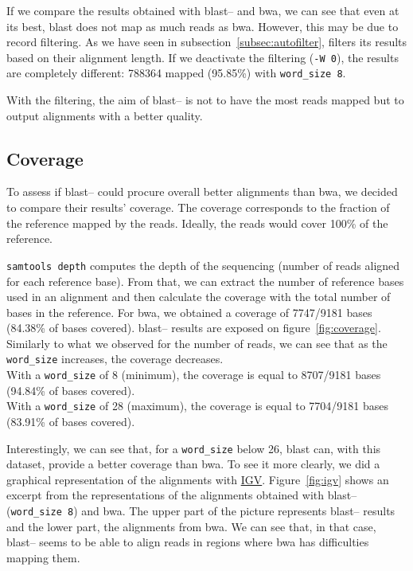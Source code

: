 If we compare the results obtained with \gls{blast}--\blastobam{} and \gls{bwa}, we can see that even at its best, \gls{blast} does not map as much reads as \gls{bwa}.
However, this may be due to \blastobam{} record filtering. As we have seen in subsection~\ref{subsec:autofilter}, \blastobam{} filters its results based on their alignment length.
If we deactivate the filtering (\texttt{-W 0}), the results are completely different: 788364 mapped (95.85\%) with \texttt{word\_size~8}.

With the filtering, the aim of \gls{blast}--\blastobam{} is not to have the most reads mapped but to output alignments with a better quality.


\subsection{Coverage}
To assess if \gls{blast}--\blastobam{} could procure overall better alignments than \gls{bwa}, we decided to compare their results' coverage.
The coverage corresponds to the fraction of the reference mapped by the reads.
Ideally, the reads would cover 100\% of the reference.

\texttt{samtools depth} computes the depth of the sequencing (number of reads aligned for each reference base).
From that, we can extract the number of reference bases used in an alignment and then calculate the coverage with the total number of bases in the reference.
For \gls{bwa}, we obtained a coverage of 7747\slash\hspace{0pt}9181 bases (84.38\% of bases covered).
\gls{blast}--\blastobam{} results are exposed on figure~\ref{fig:coverage}.
Similarly to what we observed for the number of reads, we can see that as the \texttt{word\_size} increases, the coverage decreases.\\
With a \texttt{word\_size} of 8 (minimum), the coverage is equal to 8707\slash\hspace{0pt}9181 bases (94.84\% of bases covered).\\
With a \texttt{word\_size} of 28 (maximum), the coverage is equal to 7704\slash\hspace{0pt}9181 bases (83.91\% of bases covered).

Interestingly, we can see that, for a \texttt{word\_size} below 26, \gls{blast} can, with this dataset, provide a better coverage than \gls{bwa}.
To see it more clearly, we did a graphical representation of the alignments with \href{https://www.broadinstitute.org/igv/}{IGV}.
Figure~\ref{fig:igv} shows an excerpt from the representations of the alignments obtained with \gls{blast}--\blastobam{} (\texttt{word\_size~8}) and \gls{bwa}.
The upper part of the picture represents \gls{blast}--\blastobam{} results and the lower part, the alignments from \gls{bwa}.
We can see that, in that case, \gls{blast}--\blastobam{} seems to be able to align reads in regions where \gls{bwa} has difficulties mapping them.


